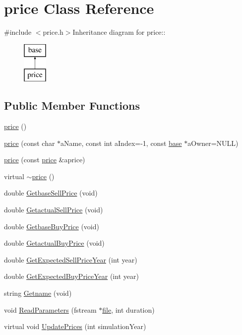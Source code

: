 \hypertarget{classprice}{
\section{price Class Reference}
\label{classprice}
}


{\ttfamily \#include $<$price.h$>$}Inheritance diagram for price::\begin{figure}[H]
\begin{center}
\leavevmode
\includegraphics[height=2cm]{classprice}
\end{center}
\end{figure}
\subsection*{Public Member Functions}
\begin{DoxyCompactItemize}
\item 
\hyperlink{classprice_ad7e902e9521e51b2988740890e8fcf2d}{price} ()
\item 
\hyperlink{classprice_ab8fd5e10683db852f47f63e280fbaec2}{price} (const char $\ast$aName, const int aIndex=-\/1, const \hyperlink{classbase}{base} $\ast$aOwner=NULL)
\item 
\hyperlink{classprice_a91c82c0d64e08f44f6a2d8944a8b5ece}{price} (const \hyperlink{classprice}{price} \&aprice)
\item 
virtual \hyperlink{classprice_a235c7d258bc22c052fc07e7c63a59c20}{$\sim$price} ()
\item 
double \hyperlink{classprice_a0283d3c7b5eb0ccfc117ee456ea40119}{GetbaseSellPrice} (void)
\item 
double \hyperlink{classprice_a15cd3b8464d303c662dee82cae26abc5}{GetactualSellPrice} (void)
\item 
double \hyperlink{classprice_a11fd350967bdb33a8594f14c02bfcdd5}{GetbaseBuyPrice} (void)
\item 
double \hyperlink{classprice_accf6ccdd9b9233912ee97522fdd591b3}{GetactualBuyPrice} (void)
\item 
double \hyperlink{classprice_a3ec175e5f77e1c47f377fc5313b7361f}{GetExpectedSellPriceYear} (int year)
\item 
double \hyperlink{classprice_a9bed928f8d0992ca3dd2f140985427a6}{GetExpectedBuyPriceYear} (int year)
\item 
string \hyperlink{classprice_aa5a8b15495994fd4d7c615938f8f76c1}{Getname} (void)
\item 
void \hyperlink{classprice_a279b89717aee067acf170b8e7f858d42}{ReadParameters} (fstream $\ast$\hyperlink{classbase_a3af52ee9891719d09b8b19b42450b6f6}{file}, int duration)
\item 
virtual void \hyperlink{classprice_a1599203e7ec6ad2dd1f8c0ee185e2d38}{UpdatePrices} (int simulationYear)
\end{DoxyCompactItemize}
